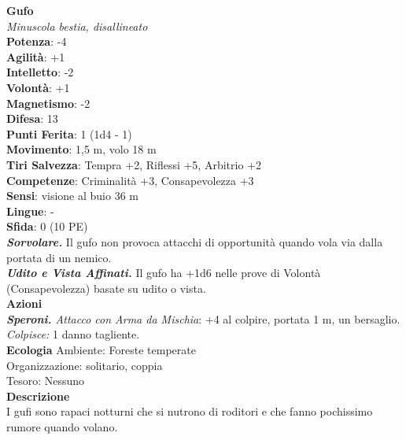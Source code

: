 \begin{multicols}{2}
\medskip\textbf{Gufo}\\
\emph{Minuscola bestia, disallineato}\\
\textbf{Potenza}: -4\\
\textbf{Agilità}: +1\\
\textbf{Intelletto}: -2\\
\textbf{Volontà}: +1\\
\textbf{Magnetismo}: -2\\
\textbf{Difesa}: 13\\
\textbf{Punti Ferita}: 1 (1d4 - 1)\\
\textbf{Movimento}: 1,5 m, volo 18 m\\
\textbf{Tiri Salvezza}: Tempra +2, Riflessi +5, Arbitrio +2 \\
\textbf{Competenze}: Criminalità +3, Consapevolezza +3\\
\textbf{Sensi}: visione al buio 36 m\\
\textbf{Lingue}: -\\
\textbf{Sfida}: 0 (10 PE)\smallskip\\
\emph{\textbf{Sorvolare.}} Il gufo non provoca attacchi di opportunità quando vola via dalla portata di un nemico.\\
\emph{\textbf{Udito e Vista Affinati.}} Il gufo ha +1d6 nelle prove di Volontà (Consapevolezza) basate su udito o vista.\\
\smallskip\textbf{Azioni}\\
\emph{\textbf{Speroni.} Attacco con Arma da Mischia}: +4 al colpire, portata 1 m, un bersaglio.\\
\emph{Colpisce:} 1 danno tagliente.\\
\textbf{Ecologia}
Ambiente: Foreste temperate\\
Organizzazione: solitario, coppia\\
Tesoro: Nessuno\\
\textbf{Descrizione}\\
I gufi sono rapaci notturni che si nutrono di roditori e che fanno pochissimo rumore quando volano. \\


\end{multicols}
